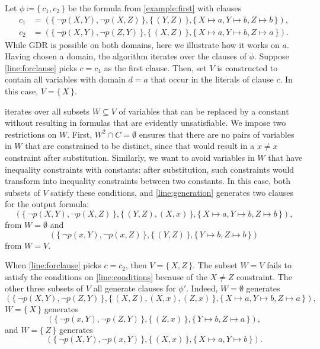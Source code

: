 \begin{example}
  Let $\phi \coloneqq \{\, c_1, c_2 \,\}$ be the formula from
  \cref{example:first} with clauses
  \begin{align*}
    c_1 &= (\{\, \neg p(X, Y), \neg p(X, Z) \,\}, \{\, (Y, Z) \,\}, \{\, X \mapsto a, Y \mapsto b, Z \mapsto b \,\}), \\
    c_2 &= (\{\, \neg p(X, Y), \neg p(Z, Y) \,\}, \{\, (X, Z) \,\}, \{\, X \mapsto a, Y \mapsto b, Z \mapsto a \,\}).
  \end{align*}
  While GDR is possible on both domains, here we illustrate how it works on $a$.
  Having chosen a domain, the algorithm iterates over the clauses of $\phi$.
  Suppose \cref{line:forclause} picks $c = c_1$ as the first clause. Then, set
  $V$ is constructed to contain all variables with domain $d = a$ that occur in
  the literals of clause $c$. In this case, $V = \{\, X \,\}$.

   iterates over all subsets $W \subseteq V$ of variables
  that can be replaced by a constant without resulting in formulas that are
  evidently unsatisfiable. We impose two restrictions on $W$. First,
  $W^2 \cap C = \emptyset$ ensures that there are no pairs of variables in $W$
  that are constrained to be distinct, since that would result in a $x \ne x$
  constraint after substitution. Similarly, we want to avoid variables in $W$
  that have inequality constraints with constants: after substitution, such
  constraints would transform into inequality constraints between two constants.
  In this case, both subsets of $V$ satisfy these conditions, and
  \cref{line:generation} generates two clauses for the output formula:
  \[
    (\{\, \neg p(X, Y), \neg p(X, Z) \,\}, \{\, (Y, Z), (X, x) \,\}, \{\, X \mapsto a, Y \mapsto b, Z \mapsto b \,\}),
  \]
  from $W = \emptyset$ and
  \[
    (\{\, \neg p(x, Y), \neg p(x, Z) \,\}, \{\, (Y, Z) \,\}, \{\, Y \mapsto b, Z \mapsto b \,\})
  \]
  from $W = V$.

  When \cref{line:forclause} picks $c = c_2$, then $V = \{\, X, Z \,\}$. The
  subset $W = V$ fails to satisfy the conditions on \cref{line:conditions}
  because of the $X \ne Z$ constraint. The other three subsets of $V$ all
  generate clauses for $\phi'$. Indeed, $W = \emptyset$ generates
  \[
    (\{\, \neg p(X, Y), \neg p(Z, Y) \,\}, \{\, (X, Z), (X, x), (Z, x) \,\}, \{\, X \mapsto a, Y \mapsto b, Z \mapsto a \,\}),
  \]
  $W = \{\, X \,\}$ generates
  \[
    (\{\, \neg p(x, Y), \neg p(Z, Y) \,\}, \{\, (Z, x) \,\}, \{\, Y \mapsto b, Z \mapsto a \,\}),
  \]
  and $W = \{\, Z \,\}$ generates
  \[
    (\{\, \neg p(X, Y), \neg p(x, Y) \,\}, \{\, (X, x) \,\}, \{\, X \mapsto a, Y \mapsto b \,\}).
  \]
\end{example}

